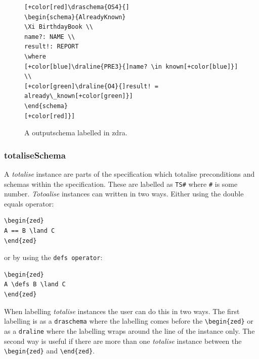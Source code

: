 \begin{figure}[H]
\centering
\begin{footnotesize}
\begin{BVerbatim}[commandchars=+\[\]]
[+color[red]\draschema{OS4}{]
\begin{schema}{AlreadyKnown}
\Xi BirthdayBook \\
name?: NAME \\
result!: REPORT
\where
[+color[blue]\draline{PRE3}{]name? \in known[+color[blue]}] \\
[+color[green]\draline{O4}{]result! = already\_known[+color[green]}]
\end{schema}
[+color[red]}]
\end{BVerbatim}
\end{footnotesize}
\caption{\label{fig:exampleofos} A outputschema labelled in \gls{zdra}.}
\end{figure}

\subsubsection{totaliseSchema}

A \emph{totalise} instance are parts of the specification which totalise preconditions and schemas within the specification. These are labelled as \verb|TS#| where \verb|#| is some number. \emph{Totoalise} instances can written in two ways. Either using the double equals operator:

\begin{verbatim}
\begin{zed}
A == B \land C
\end{zed}
\end{verbatim}

or by using the \verb|defs operator|:

\begin{verbatim}
\begin{zed}
A \defs B \land C
\end{zed}
\end{verbatim}

When labelling \emph{totalise} instances the user can do this in two ways. The first labelling is as a \verb|draschema| where the labelling comes before the \verb|\begin{zed}| or as a \verb|draline| where the labelling wraps around the line of the instance only. The second way is useful if there are more than one \emph{totalise} instance between the \verb|\begin{zed}| and \verb|\end{zed}|. 

